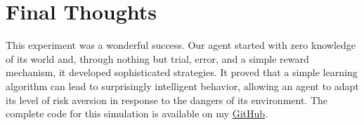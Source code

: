 \documentclass[11pt, a4paper]{article}
\begin{document}
\section{Final Thoughts}
This experiment was a wonderful success. Our agent started with zero knowledge of its world and, through nothing but trial, error, and a simple reward mechanism, it developed sophisticated strategies. It proved that a simple learning algorithm can lead to surprisingly intelligent behavior, allowing an agent to adapt its level of risk aversion in response to the dangers of its environment. The complete code for this simulation is available on my \href{https://github.com/Jeevan-HM/RL-in-Robotics.git}{GitHub}.
\end{document}
